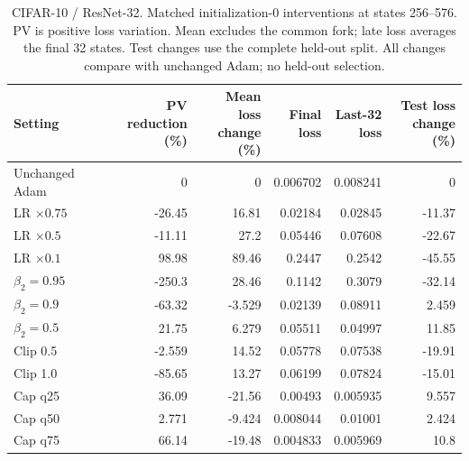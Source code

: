 \begin{table}[H]
\centering
\small
\setlength{\tabcolsep}{4pt}
\begin{tabular}{lrrrrr}
\toprule
Setting & \shortstack{PV reduction\\(\%)} & \shortstack{Mean loss\\change (\%)} & \shortstack{Final\\loss} & \shortstack{Last-32\\loss} & \shortstack{Test loss\\change (\%)} \\
\midrule
Unchanged Adam & 0 & 0 & 0.006702 & 0.008241 & 0 \\
LR $\times0.75$ & -26.45 & 16.81 & 0.02184 & 0.02845 & -11.37 \\
LR $\times0.5$ & -11.11 & 27.2 & 0.05446 & 0.07608 & -22.67 \\
LR $\times0.1$ & 98.98 & 89.46 & 0.2447 & 0.2542 & -45.55 \\
$\beta_2=0.95$ & -250.3 & 28.46 & 0.1142 & 0.3079 & -32.14 \\
$\beta_2=0.9$ & -63.32 & -3.529 & 0.02139 & 0.08911 & 2.459 \\
$\beta_2=0.5$ & 21.75 & 6.279 & 0.05511 & 0.04997 & 11.85 \\
Clip 0.5 & -2.559 & 14.52 & 0.05778 & 0.07538 & -19.91 \\
Clip 1.0 & -85.65 & 13.27 & 0.06199 & 0.07824 & -15.01 \\
Cap q25 & 36.09 & -21.56 & 0.00493 & 0.005935 & 9.557 \\
Cap q50 & 2.771 & -9.424 & 0.008044 & 0.01001 & 2.424 \\
Cap q75 & 66.14 & -19.48 & 0.004833 & 0.005969 & 10.8 \\
\bottomrule
\end{tabular}
\caption{CIFAR-10 / ResNet-32. Matched initialization-0 interventions at states 256--576. PV is positive loss variation. Mean excludes the common fork; late loss averages the final 32 states. Test changes use the complete held-out split. All changes compare with unchanged Adam; no held-out selection.}
\end{table}


